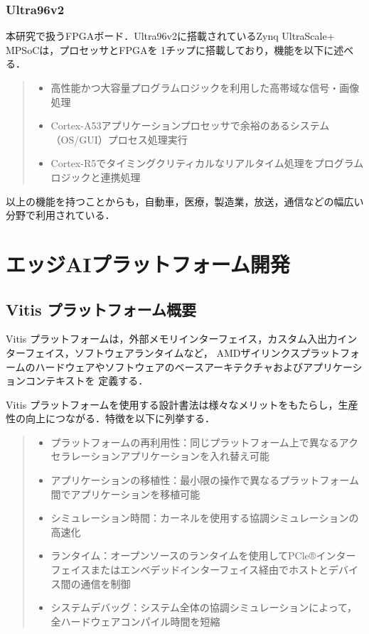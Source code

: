 \documentclass[11pt,a4j]{jreport}
\begin{document}
\subsection{Ultra96v2}
本研究で扱うFPGAボード．Ultra96v2に搭載されているZynq UltraScale+ MPSoCは，プロセッサとFPGAを
1チップに搭載しており，機能を以下に述べる．
\begin{quote}
  \begin{itemize}
    \item 高性能かつ大容量プログラムロジックを利用した高帯域な信号・画像処理
    \item Cortex-A53アプリケーションプロセッサで余裕のあるシステム（OS/GUI）プロセス処理実行
    \item Cortex-R5でタイミングクリティカルなリアルタイム処理をプログラムロジックと連携処理
  \end{itemize}
\end{quote}
以上の機能を持つことからも，自動車，医療，製造業，放送，通信などの幅広い分野で利用されている．

%
\chapter{エッジAIプラットフォーム開発}
\section{Vitis プラットフォーム概要}
Vitis プラットフォームは，外部メモリインターフェイス，カスタム入出力インターフェイス，ソフトウェアランタイムなど，
AMDザイリンクスプラットフォームのハードウェアやソフトウェアのベースアーキテクチャおよびアプリケーションコンテキストを
定義する．

Vitis プラットフォームを使用する設計書法は様々なメリットをもたらし，生産性の向上につながる．特徴を以下に列挙する．
\begin{quote}
  \begin{itemize}
    \item プラットフォームの再利用性：同じプラットフォーム上で異なるアクセラレーションアプリケーションを入れ替え可能
    \item アプリケーションの移植性：最小限の操作で異なるプラットフォーム間でアプリケーションを移植可能
    \item シミュレーション時間：カーネルを使用する協調シミュレーションの高速化
    \item ランタイム：オープンソースのランタイムを使用してPCle®インターフェイスまたはエンベデッドインターフェイス経由でホストとデバイス間の通信を制御
    \item システムデバッグ：システム全体の協調シミュレーションによって，全ハードウェアコンパイル時間を短縮
  \end{itemize}
\end{quote}
\end{document}
